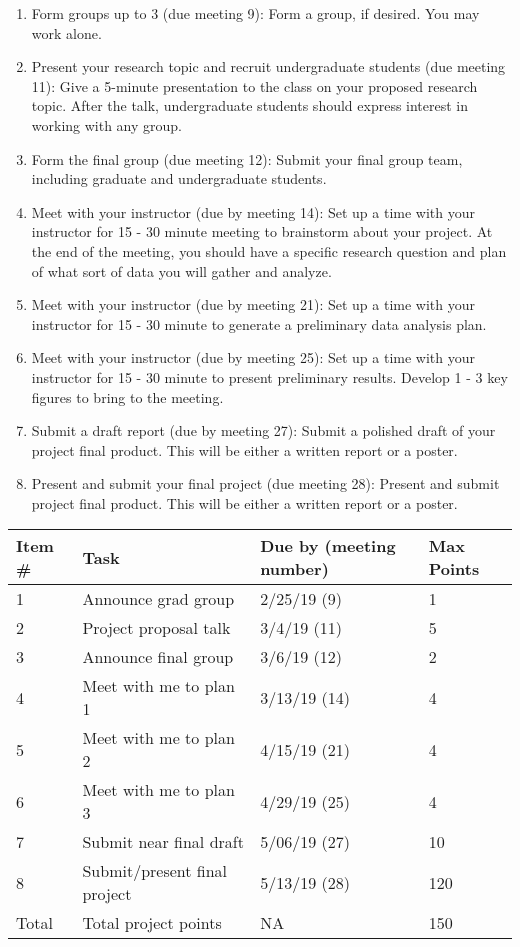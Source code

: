 \documentclass[11pt,onecolumn]{article}
\begin{document}
\begin{enumerate}
  \itemsep0em
\item Form groups up to 3 (due meeting 9): Form a group, if desired. You may work alone.
\item Present your research topic and recruit undergraduate students (due meeting 11): Give a 5-minute presentation to the class on your proposed research topic. After the talk, undergraduate students should express interest in working with any group.
\item Form the final group (due meeting 12): Submit your final group team, including graduate and undergraduate students.
\item Meet with your instructor (due by meeting 14): Set up a time with your instructor for 15 - 30 minute meeting to brainstorm about your project. At the end of the meeting, you should have a specific research question and plan of what sort of data you will gather and analyze.
\item Meet with your instructor (due by meeting 21): Set up a time with your instructor for 15 - 30 minute to generate a preliminary data analysis plan.
\item Meet with your instructor (due by meeting 25): Set up a time with your instructor for 15 - 30 minute to present preliminary results. Develop 1 - 3 key figures to bring to the meeting.
\item Submit a draft report (due by meeting 27): Submit a polished draft of your project final product. This will be either a written report or a poster.
\item Present and submit your final project (due meeting 28): Present and submit project final product. This will be either a written report or a poster.
  
\end{enumerate}

\begin{table}
  \centering
  \begin{tabular}{l|lll}
    Item \# & Task & Due by (meeting number) & Max Points \\
    \hline
    1 & Announce grad group & 2/25/19 (9) & 1 \\
    2 & Project proposal talk & 3/4/19 (11) & 5 \\
    3 & Announce final group & 3/6/19 (12) & 2 \\
    4 & Meet with me to plan 1 & 3/13/19 (14) & 4 \\
    5 & Meet with me to plan 2 & 4/15/19 (21) & 4 \\
    6 & Meet with me to plan 3 & 4/29/19 (25) & 4 \\
    7 & Submit near final draft & 5/06/19 (27) & 10 \\
    8 & Submit/present final project & 5/13/19 (28) & 120 \\
    \hline
    Total & Total project points & NA & 150 \\
  \end{tabular}
\end{table}
\end{document}
